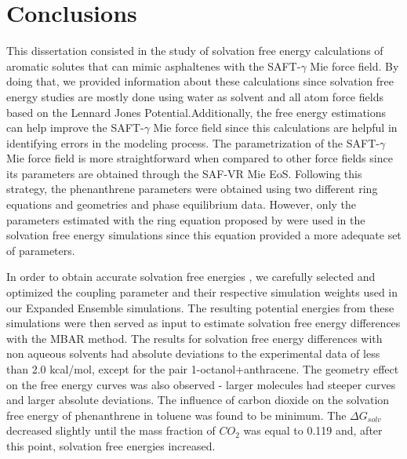 \chapter{Conclusions} %

\label{Chapter6} %

This dissertation consisted in  the study of solvation free
energy calculations of aromatic solutes that can mimic asphaltenes with the SAFT-$\gamma$ 
Mie force field. By doing that, we provided information about these calculations since solvation free energy studies are mostly done using  water as solvent and all atom force fields based on the Lennard Jones Potential.Additionally, the free energy estimations can help improve the SAFT-$\gamma$  Mie force field since this calculations are helpful in identifying errors in the modeling process. The parametrization of the SAFT-$\gamma$  Mie force field is more straightforward
when compared to other force fields since its parameters are obtained through the SAF-VR
Mie EoS. Following this strategy, the phenanthrene parameters were obtained using two
different ring equations and geometries and phase equilibrium data. However, only the parameters estimated with the ring equation proposed by  were used in the solvation free energy simulations since this equation provided a more adequate set of parameters.


In order to obtain accurate solvation free energies , we carefully selected and optimized the coupling parameter and their respective simulation weights used in our Expanded Ensemble simulations. The resulting potential energies from these simulations were then served as input to estimate solvation free energy differences with the MBAR method. The results for solvation free energy differences with non aqueous solvents had absolute deviations to the experimental
data of less than 2.0 kcal/mol, except for the pair 1-octanol+anthracene. The geometry
effect on the free energy curves was also observed - larger molecules had steeper curves
and larger absolute deviations. The influence of carbon dioxide on the solvation free
energy of phenanthrene in toluene was found to be minimum. The $\Delta G_{solv}$ decreased slightly until the mass fraction of $CO_{2}$ was equal to 0.119 and, after this point, solvation free
energies increased. 


